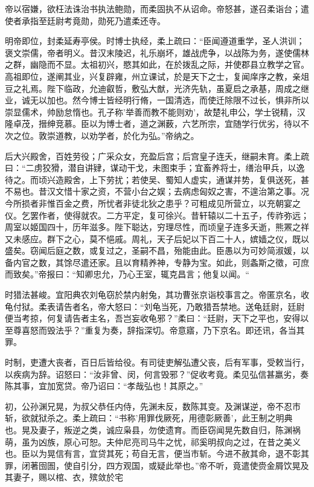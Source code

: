 \documentclass[12pt,UTF8]{ctexbook}
\begin{document}
帝以宿嫌，欲枉法诛治书执法鲍勋，而柔固执不从诏命。帝怒甚，遂召柔诣台；遣使者承指至廷尉考竟勋，勋死乃遣柔还寺。

明帝即位，封柔延寿亭侯。时博士执经，柔上疏曰：“臣闻遵道重学，圣人洪训；褒文崇儒，帝者明义。昔汉末陵迟，礼乐崩坏，雄战虎争，以战陈为务，遂使儒林之群，幽隐而不显。太祖初兴，愍其如此，在於拨乱之际，并使郡县立教学之官。高祖即位，遂阐其业，兴复辟雍，州立课试，於是天下之士，复闻庠序之教，亲俎豆之礼焉。陛下临政，允迪叡哲，敷弘大猷，光济先轨，虽夏启之承基，周成之继业，诚无以加也。然今博士皆经明行脩，一国清选，而使迁除限不过长，惧非所以崇显儒术，帅励怠惰也。孔子称'举善而教不能则劝'，故楚礼申公，学士锐精，汉隆卓茂，搢绅竞慕。臣以为博士者，道之渊薮，六艺所宗，宜随学行优劣，待以不次之位。敦崇道教，以劝学者，於化为弘。”帝纳之。

后大兴殿舍，百姓劳役；广采众女，充盈后宫；后宫皇子连夭，继嗣未育。柔上疏曰：“二虏狡猾，潜自讲肄，谋动干戈，未图束手；宜畜养将士，缮治甲兵，以逸待之。而顷兴造殿舍，上下劳扰；若使吴、蜀知人虚实，通谋并势，复俱送死，甚不易也。昔汉文惜十家之资，不营小台之娱；去病虑匈奴之害，不遑治第之事。况今所损者非惟百金之费，所忧者非徒北狄之患乎？可粗成见所营立，以充朝宴之仪。乞罢作者，使得就农。二方平定，复可徐兴。昔轩辕以二十五子，传祚弥远；周室以姬国四十，历年滋多。陛下聪达，穷理尽性，而顷皇子连多夭逝，熊罴之祥又未感应。群下之心，莫不悒戚。周礼，天子后妃以下百二十人，嫔嫱之仪，既以盛矣。窃闻后庭之数，或复过之，圣嗣不昌，殆能由此。臣愚以为可妙简淑媛，以备内官之数，其馀尽遣还家。且以育精养神，专静为宝。如此，则螽斯之徵，可庶而致矣。”帝报曰：“知卿忠允，乃心王室，辄克昌言；他复以闻。“

时猎法甚峻。宜阳典农刘龟窃於禁内射兔，其功曹张京诣校事言之。帝匿京名，收龟付狱。柔表请告者名，帝大怒曰：“刘龟当死，乃敢猎吾禁地。送龟廷尉，廷尉便当考掠，何复请告者主名，吾岂妄收龟邪？”柔曰：“廷尉，天下之平也，安得以至尊喜怒而毁法乎？”重复为奏，辞指深切。帝意寤，乃下京名。即还讯，各当其罪。

时制，吏遭大丧者，百日后皆给役。有司徒吏解弘遭父丧，后有军事，受敕当行，以疾病为辞。诏怒曰：“汝非曾、闵，何言毁邪？”促收考竟。柔见弘信甚羸劣，奏陈其事，宜加宽贷。帝乃诏曰：“孝哉弘也！其原之。”

初，公孙渊兄晃，为叔父恭任内侍，先渊未反，数陈其变。及渊谋逆，帝不忍巿斩，欲就狱杀之。柔上疏曰：“书称'用罪伐厥死，用德彰厥善'，此王制之明典也。晃及妻子，叛逆之类，诚应枭县，勿使遗育。而臣窃闻晃先数自归，陈渊祸萌，虽为凶族，原心可恕。夫仲尼亮司马牛之忧，祁奚明叔向之过，在昔之美义也。臣以为晃信有言，宜贷其死；苟自无言，便当巿斩。今进不赦其命，退不彰其罪，闭著囹圄，使自引分，四方观国，或疑此举也。”帝不听，竟遣使赍金屑饮晃及其妻子，赐以棺、衣，殡敛於宅
\end{document}
